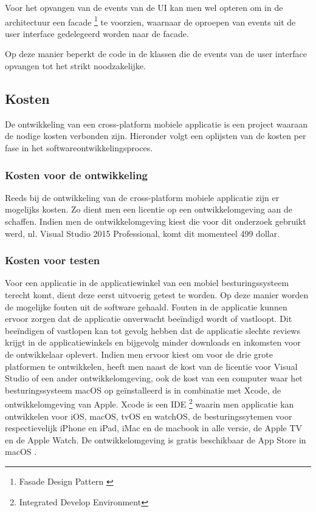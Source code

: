 Voor het opvangen van de events van de UI kan men wel opteren om in de architectuur een facade \footnote{Fasade Design Pattern \cite{dofactorycom2017}} te voorzien, waarnaar de oproepen van events uit de user interface gedelegeerd worden naar de facade.

Op deze manier beperkt de code in de klassen die de events van de user interface opvangen tot het strikt noodzakelijke.
\label{sec:appkosten}
\subsection{Kosten}
De ontwikkeling van een cross-platform mobiele applicatie is een project waaraan de nodige kosten verbonden zijn.
Hieronder volgt een oplijsten van de kosten per fase in het softwareontwikkelingsproces.

\subsubsection{Kosten voor de ontwikkeling}
Reeds bij de ontwikkeling van de cross-platform mobiele applicatie zijn er mogelijks kosten. Zo dient men een licentie op een ontwikkelomgeving
aan de schaffen. Indien men de ontwikkelomgeving kiest die voor dit onderzoek gebruikt werd, nl. Visual Studio 2015 Professional,
komt dit momenteel 499 dollar.

\subsubsection{Kosten voor testen}
Voor een applicatie in de applicatiewinkel van een mobiel besturingssysteem terecht komt, dient deze eerst uitvoerig getest te
worden. Op deze manier worden de mogelijke fouten uit de software gehaald. Fouten in de applicatie kunnen ervoor zorgen dat de applicatie
onverwacht beeïndigd wordt of vastloopt.
Dit beeïndigen of vastlopen kan tot gevolg hebben dat de applicatie slechte reviews krijgt in de applicatiewinkels en bijgevolg minder downloads en inkomsten voor de ontwikkelaar oplevert.
\newpage
Indien men ervoor kiest om voor de drie grote platformen te ontwikkelen, heeft men naast de kost van de licentie voor Visual Studio of een ander ontwikkelomgeving,
ook de kost van een computer waar het besturingssysteem macOS op geïnstalleerd is in combinatie met Xcode, de ontwikkelomgeving van Apple.
Xcode is een IDE \footnote{Integrated Develop Environment} waarin men applicatie kan ontwikkelen voor iOS, macOS, tvOS en watchOS, de besturingssytemen voor respectievelijk iPhone en iPad,
iMac en de macbook in alle versie, de Apple TV en de Apple Watch. De ontwikkelomgeving is gratis beschikbaar de App Store in macOS \citep{xcodemacappstore2017}.

